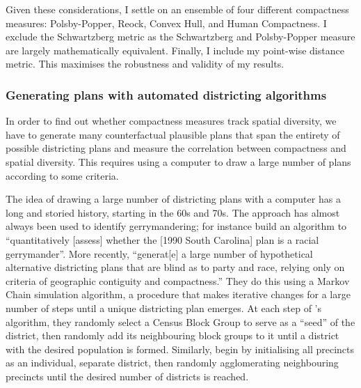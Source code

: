 \documentclass[]{article}
\begin{document}
Given these considerations, I settle on an ensemble of four different
compactness measures: Polsby-Popper, Reock, Convex Hull, and Human
Compactness. I exclude the Schwartzberg metric as the Schwartzberg and
Polsby-Popper measure are largely mathematically equivalent. Finally, I
include my point-wise distance metric. This maximises the robustness and
validity of my results.

\hypertarget{generating-plans-with-automated-districting-algorithms}{%
\subsubsection{Generating plans with automated districting
algorithms}\label{generating-plans-with-automated-districting-algorithms}}

In order to find out whether compactness measures track spatial
diversity, we have to generate many counterfactual plausible plans that
span the entirety of possible districting plans and measure the
correlation between compactness and spatial diversity. This requires
using a computer to draw a large number of plans according to some
criteria.

The idea of drawing a large number of districting plans with a computer
has a long and storied history, starting in the 60s and 70s. The
approach has almost always been used to identify gerrymandering; for
instance \cite{ccd2000} build an algorithm to ``quantitatively
{[}assess{]} whether the {[}1990 South Carolina{]} plan is a racial
gerrymander''. More recently, \cite{cr2013} ``generat{[}e{]} a large
number of hypothetical alternative districting plans that are blind as
to party and race, relying only on criteria of geographic contiguity and
compactness.'' They do this using a Markov Chain simulation algorithm, a
procedure that makes iterative changes for a large number of steps until
a unique districting plan emerges. At each step of
\citeauthor{ccd2000}'s algorithm, they randomly select a Census Block
Group to serve as a ``seed'' of the district, then randomly add its
neighbouring block groups to it until a district with the desired
population is formed. Similarly, \citeauthor{cr2013} begin by
initialising all precincts as an individual, separate district, then
randomly agglomerating neighbouring precincts until the desired number
of districts is reached.
\end{document}
